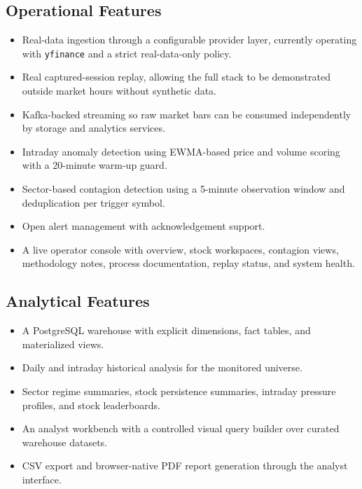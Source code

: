\documentclass[11pt,a4paper]{article}
\begin{document}
\subsection{Operational Features}
\begin{itemize}
    \item Real-data ingestion through a configurable provider layer, currently operating with \texttt{yfinance} and a strict real-data-only policy.
    \item Real captured-session replay, allowing the full stack to be demonstrated outside market hours without synthetic data.
    \item Kafka-backed streaming so raw market bars can be consumed independently by storage and analytics services.
    \item Intraday anomaly detection using EWMA-based price and volume scoring with a 20-minute warm-up guard.
    \item Sector-based contagion detection using a 5-minute observation window and deduplication per trigger symbol.
    \item Open alert management with acknowledgement support.
    \item A live operator console with overview, stock workspaces, contagion views, methodology notes, process documentation, replay status, and system health.
\end{itemize}

\subsection{Analytical Features}
\begin{itemize}
    \item A PostgreSQL warehouse with explicit dimensions, fact tables, and materialized views.
    \item Daily and intraday historical analysis for the monitored universe.
    \item Sector regime summaries, stock persistence summaries, intraday pressure profiles, and stock leaderboards.
    \item An analyst workbench with a controlled visual query builder over curated warehouse datasets.
    \item CSV export and browser-native PDF report generation through the analyst interface.
\end{itemize}
\end{document}
